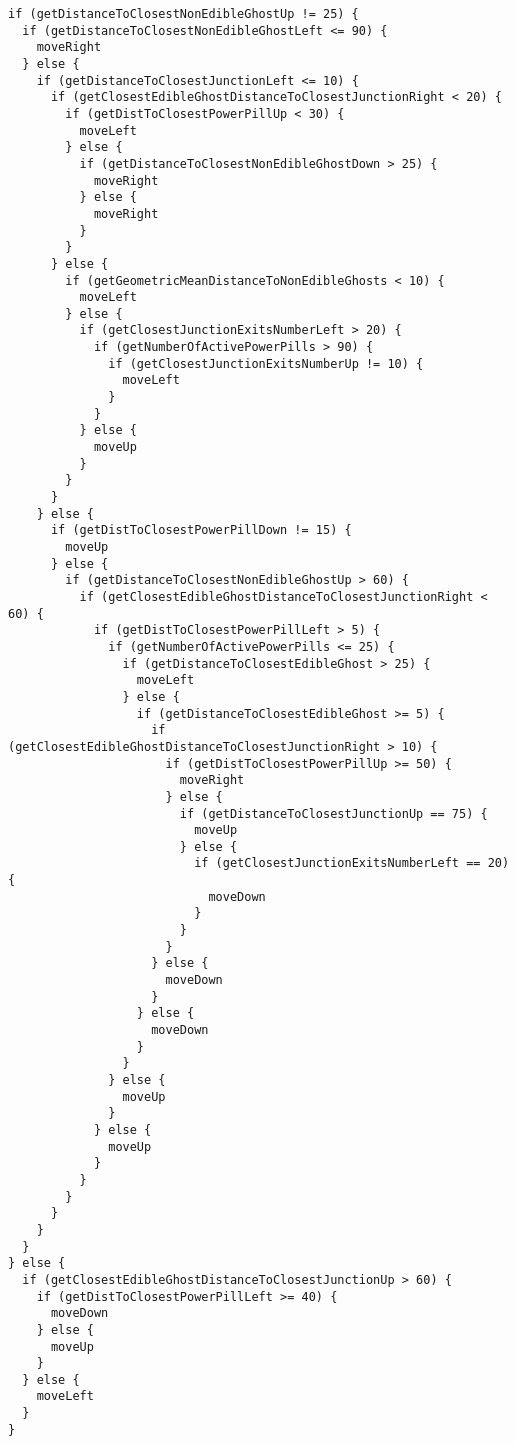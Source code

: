 \begin{lstlisting}[caption={Ejemplo de bot típico producido usando la gramática de bajo nivel entrenado contra Random Ghosts.}]
if (getDistanceToClosestNonEdibleGhostUp != 25) {
  if (getDistanceToClosestNonEdibleGhostLeft <= 90) {
    moveRight
  } else {
    if (getDistanceToClosestJunctionLeft <= 10) {
      if (getClosestEdibleGhostDistanceToClosestJunctionRight < 20) {
        if (getDistToClosestPowerPillUp < 30) {
          moveLeft
        } else {
          if (getDistanceToClosestNonEdibleGhostDown > 25) {
            moveRight
          } else {
            moveRight
          }
        }
      } else {
        if (getGeometricMeanDistanceToNonEdibleGhosts < 10) {
          moveLeft
        } else {
          if (getClosestJunctionExitsNumberLeft > 20) {
            if (getNumberOfActivePowerPills > 90) {
              if (getClosestJunctionExitsNumberUp != 10) {
                moveLeft
              }
            }
          } else {
            moveUp
          }
        }
      }
    } else {
      if (getDistToClosestPowerPillDown != 15) {
        moveUp
      } else {
        if (getDistanceToClosestNonEdibleGhostUp > 60) {
          if (getClosestEdibleGhostDistanceToClosestJunctionRight < 60) {
            if (getDistToClosestPowerPillLeft > 5) {
              if (getNumberOfActivePowerPills <= 25) {
                if (getDistanceToClosestEdibleGhost > 25) {
                  moveLeft
                } else {
                  if (getDistanceToClosestEdibleGhost >= 5) {
                    if (getClosestEdibleGhostDistanceToClosestJunctionRight > 10) {
                      if (getDistToClosestPowerPillUp >= 50) {
                        moveRight
                      } else {
                        if (getDistanceToClosestJunctionUp == 75) {
                          moveUp
                        } else {
                          if (getClosestJunctionExitsNumberLeft == 20) {
                            moveDown
                          }
                        }
                      }
                    } else {
                      moveDown
                    }
                  } else {
                    moveDown
                  }
                }
              } else {
                moveUp
              }
            } else {
              moveUp
            }
          }
        }
      }
    }
  }
} else {
  if (getClosestEdibleGhostDistanceToClosestJunctionUp > 60) {
    if (getDistToClosestPowerPillLeft >= 40) {
      moveDown
    } else {
      moveUp
    }
  } else {
    moveLeft
  }
}
\end{lstlisting}

